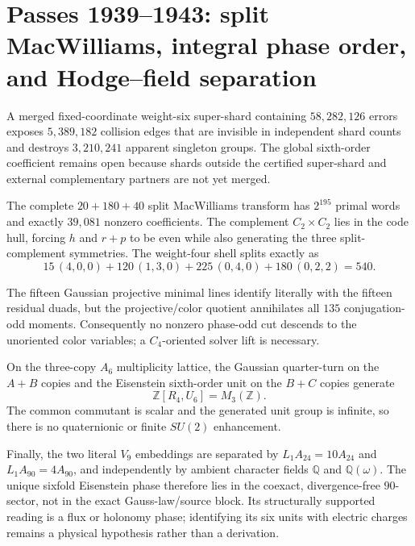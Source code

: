 \section*{Passes 1939--1943: split MacWilliams, integral phase order, and Hodge--field separation}
A merged fixed-coordinate weight-six super-shard containing
$58{,}282{,}126$ errors exposes $5{,}389{,}182$ collision edges that are
invisible in independent shard counts and destroys $3{,}210{,}241$ apparent
singleton groups.  The global sixth-order coefficient remains open because
shards outside the certified super-shard and external complementary partners
are not yet merged.

The complete $20+180+40$ split MacWilliams transform has $2^{195}$ primal
words and exactly $39{,}081$ nonzero coefficients.  The complement
$C_2\times C_2$ lies in the code hull, forcing $h$ and $r+p$ to be even while
also generating the three split-complement symmetries.  The weight-four shell
splits exactly as
\[
15\,(4,0,0)+120\,(1,3,0)+225\,(0,4,0)+180\,(0,2,2)=540.
\]

The fifteen Gaussian projective minimal lines identify literally with the
fifteen residual duads, but the projective/color quotient annihilates all
$135$ conjugation-odd moments.  Consequently no nonzero phase-odd cut descends
to the unoriented color variables; a $C_4$-oriented solver lift is necessary.

On the three-copy $A_6$ multiplicity lattice, the Gaussian quarter-turn on the
$A+B$ copies and the Eisenstein sixth-order unit on the $B+C$ copies generate
\[
\mathbb Z[R_4,U_6]=M_3(\mathbb Z).
\]
The common commutant is scalar and the generated unit group is infinite, so
there is no quaternionic or finite $SU(2)$ enhancement.

Finally, the two literal $V_9$ embeddings are separated by
$L_1A_{24}=10A_{24}$ and $L_1A_{90}=4A_{90}$, and independently by ambient
character fields $\mathbb Q$ and $\mathbb Q(\omega)$.  The unique sixfold
Eisenstein phase therefore lies in the coexact, divergence-free $90$-sector,
not in the exact Gauss-law/source block.  Its structurally supported reading is
a flux or holonomy phase; identifying its six units with electric charges
remains a physical hypothesis rather than a derivation.
